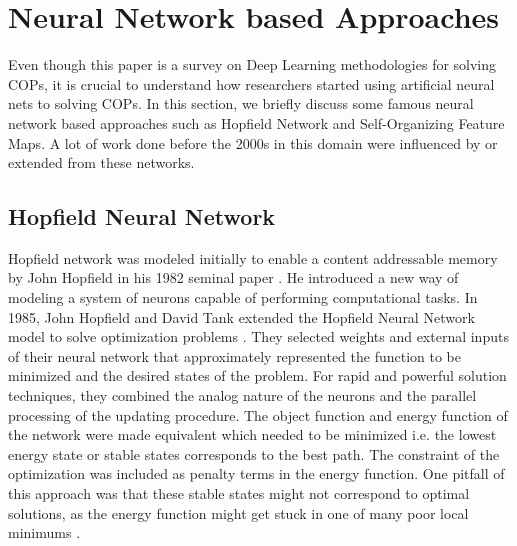 \documentclass{article}
\begin{document}
\section{Neural Network based Approaches}
Even though this paper is a survey on Deep Learning methodologies for solving COPs, it is crucial to understand how researchers started using artificial neural nets to solving COPs. In this section, we briefly discuss some famous neural network based approaches such as Hopfield Network and Self-Organizing Feature Maps. A lot of work done before the 2000s in this domain were influenced by or extended from these networks. 

\subsection{Hopfield Neural Network}
Hopfield network was modeled initially to enable a content addressable memory \cite{smith1999neural} by John Hopfield in his 1982 seminal paper \cite{hopfield1982neural}. He introduced a new way of modeling a system of neurons capable of performing computational tasks. In 1985, John Hopfield and David Tank extended the Hopfield Neural Network model to solve optimization problems \cite{hopfield1985neural}. They selected weights and external inputs of their neural network that approximately represented the function to be minimized and the desired states of the problem. For rapid and powerful solution techniques, they combined the analog nature of the neurons and the parallel processing of the updating procedure. The object function and energy function of the network were made equivalent which needed to be minimized i.e. the lowest energy state or stable states corresponds to the best path. The constraint of the optimization was included as penalty terms in the energy function. One pitfall of this approach was that these stable states might not correspond to optimal solutions, as the energy function might get stuck in one of many poor local minimums \cite{smith1999neural}.
\end{document}
